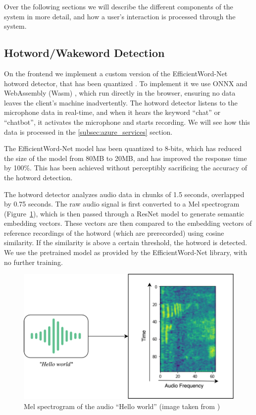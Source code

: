 \documentclass[a4paper,12pt,twoside]{ThesisStyle}
\begin{document}
Over the following sections we will describe the different components of the system in more detail, and how a user's interaction is processed through the system.

\subsection{Hotword/Wakeword Detection}
On the frontend we implement a custom version of the EfficientWord-Net \cite{Chidhambararajan2022EfficientWordNet} hotword detector, that has been quantized \cite{Zhang2023PostTrainingQuantizationNeuralNetworks}. To implement it we use ONNX \cite{onnx} and WebAssembly (Wasm) \cite{wasm}, which run directly in the browser, ensuring no data leaves the client's machine inadvertently. The hotword detector listens to the microphone data in real-time, and when it hears the keyword ``chat'' or ``chatbot'', it activates the microphone and starts recording. We will see how this data is processed in the \ref{subsec:azure_services} section.

The EfficientWord-Net model has been quantized to 8-bits, which has reduced the size of the model from 80MB to 20MB, and has improved the response time by 100\%. This has been achieved without perceptibly sacrificing the accuracy of the hotword detection.

The hotword detector analyzes audio data in chunks of 1.5 seconds, overlapped by 0.75 seconds. The raw audio signal is first converted to a Mel spectrogram (Figure~\ref{fig:mel_spectrogram}), which is then passed through a ResNet \cite{He2015DeepResidualLearningImage} model to generate semantic embedding vectors. These vectors are then compared to the embedding vectors of reference recordings of the hotword (which are prerecorded) using cosine similarity. If the similarity is above a certain threshold, the hotword is detected.
We use the pretrained model as provided by the EfficientWord-Net library, with no further training.

\begin{figure}[htb]
  \centering
  \includegraphics[width=1\textwidth]{imatges/MelSpectrogram.png}
  \caption{Mel spectrogram of the audio ``Hello world'' (image taken from \cite{Chidhambararajan2022EfficientWordNet})}
  \label{fig:mel_spectrogram}
\end{figure}
\end{document}
